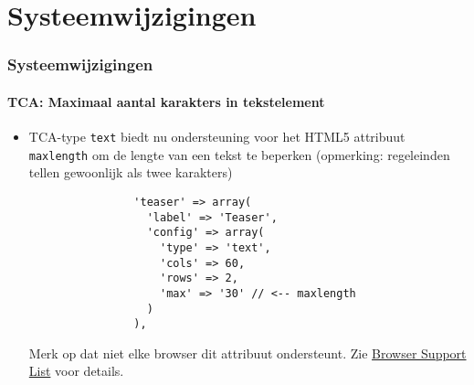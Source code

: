 %

\section{Systeemwijzigingen}


\begin{frame}[fragile]
	\frametitle{Systeemwijzigingen}
	\framesubtitle{TCA: Maximaal aantal karakters in tekstelement}

	\begin{itemize}
		\item TCA-type \texttt{text} biedt nu ondersteuning voor het HTML5 attribuut \texttt{maxlength}
			om de lengte van een tekst te beperken (opmerking: regeleinden tellen gewoonlijk als twee karakters)

			\begin{lstlisting}
				'teaser' => array(
				  'label' => 'Teaser',
				  'config' => array(
				    'type' => 'text',
				    'cols' => 60,
				    'rows' => 2,
				    'max' => '30' // <-- maxlength
				  )
				),
			\end{lstlisting}

			Merk op dat niet elke browser dit attribuut ondersteunt.\newline
			Zie \href{http://www.w3schools.com/tags/att_textarea_maxlength.asp}{Browser Support List} voor details.

	\end{itemize}

\end{frame}

